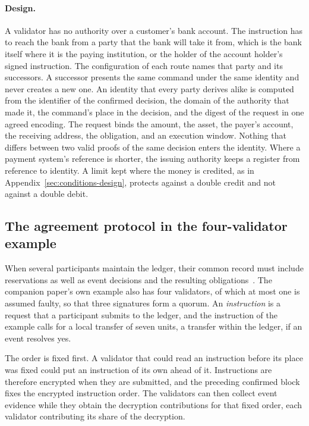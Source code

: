 \documentclass{momentum}
\begin{document}
\paragraph{Design.} A validator has no authority over a customer's bank account. The instruction has to reach the bank from a party that the bank will take it from, which is the bank itself where it is the paying institution, or the holder of the account holder's signed instruction. The configuration of each route names that party and its successors. A successor presents the same command under the same identity and never creates a new one. An identity that every party derives alike is computed from the identifier of the confirmed decision, the domain of the authority that made it, the command's place in the decision, and the digest of the request in one agreed encoding. The request binds the amount, the asset, the payer's account, the receiving address, the obligation, and an execution window. Nothing that differs between two valid proofs of the same decision enters the identity. Where a payment system's reference is shorter, the issuing authority keeps a register from reference to identity. A limit kept where the money is credited, as in Appendix~\ref{sec:conditions-design}, protects against a double credit and not against a double debit.

\subsection{The agreement protocol in the four-validator example}
\label{sec:conditions-agreement}

When several participants maintain the ledger, their common record must include reservations as well as event decisions and the resulting obligations~\cite{event}. The companion paper's own example also has four validators, of which at most one is assumed faulty, so that three signatures form a quorum. An \emph{instruction} is a request that a participant submits to the ledger, and the instruction of the example calls for a local transfer of seven units, a transfer within the ledger, if an event resolves yes.

The order is fixed first. A validator that could read an instruction before its place was fixed could put an instruction of its own ahead of it. Instructions are therefore encrypted when they are submitted, and the preceding confirmed block fixes the encrypted instruction order. The validators can then collect event evidence while they obtain the decryption contributions for that fixed order, each validator contributing its share of the decryption.
\end{document}

